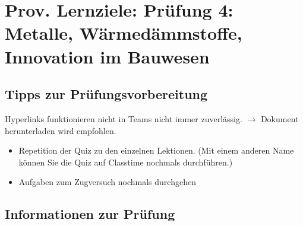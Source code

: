 



\newcommand{\blattname}{Prov. Lernziele: Prüfung 4: Metalle, Wärmedämmstoffe, Innovation im Bauwesen}
\newcommand{\Added}[1]{\textcolor{blue}{#1}}



\section*{\blattname}
\subsection*{Tipps zur Prüfungsvorbereitung}
Hyperlinks funktionieren nicht in Teams nicht immer zuverlässig. $\rightarrow$ Dokument herunterladen wird empfohlen.
\begin{itemize}
	\item Repetition der Quiz zu den einzelnen Lektionen. (Mit einem anderen Name können Sie die Quiz auf Classtime nochmals durchführen.)
	\item Aufgaben zum Zugversuch nochmals durchgehen

\end{itemize}

\subsection*{Informationen zur Prüfung}

